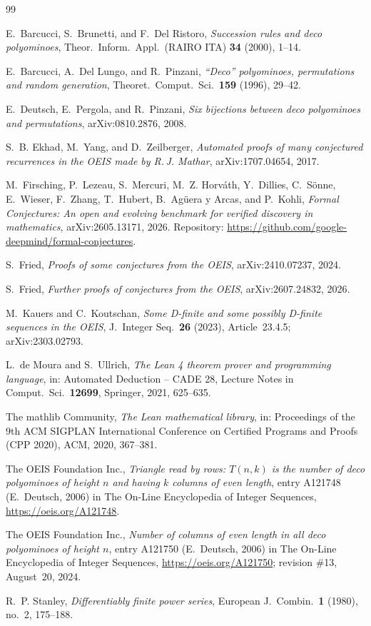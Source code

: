 \documentclass[11pt]{amsart}
\theoremstyle{plain}
\theoremstyle{definition}
\begin{document}
{\footnotesize
\begin{thebibliography}{99}

E.~Barcucci, S.~Brunetti, and F.~Del Ristoro, \emph{Succession rules and deco polyominoes}, Theor.\ Inform.\ Appl.\ (RAIRO ITA) \textbf{34} (2000), 1--14.

E.~Barcucci, A.~Del Lungo, and R.~Pinzani, \emph{``Deco'' polyominoes, permutations and random generation}, Theoret.\ Comput.\ Sci.\ \textbf{159} (1996), 29--42.

E.~Deutsch, E.~Pergola, and R.~Pinzani, \emph{Six bijections between deco polyominoes and permutations}, arXiv:0810.2876, 2008.

S.~B. Ekhad, M.~Yang, and D.~Zeilberger, \emph{Automated proofs of many conjectured recurrences in the OEIS made by R.\,J. Mathar}, arXiv:1707.04654, 2017.

M.~Firsching, P.~Lezeau, S.~Mercuri, M.~Z. Horv\'ath, Y.~Dillies, C.~S\"onne, E.~Wieser, F.~Zhang, T.~Hubert, B.~Ag\"uera y Arcas, and P.~Kohli, \emph{Formal Conjectures: An open and evolving benchmark for verified discovery in mathematics}, arXiv:2605.13171, 2026. Repository: \url{https://github.com/google-deepmind/formal-conjectures}.

S.~Fried, \emph{Proofs of some conjectures from the OEIS}, arXiv:2410.07237, 2024.

S.~Fried, \emph{Further proofs of conjectures from the OEIS}, arXiv:2607.24832, 2026.

M.~Kauers and C.~Koutschan, \emph{Some D-finite and some possibly D-finite sequences in the OEIS}, J.\ Integer Seq.\ \textbf{26} (2023), Article~23.4.5; arXiv:2303.02793.

L.~de Moura and S.~Ullrich, \emph{The Lean 4 theorem prover and programming language}, in: Automated Deduction -- CADE 28, Lecture Notes in Comput.\ Sci.\ \textbf{12699}, Springer, 2021, 625--635.

The mathlib Community, \emph{The Lean mathematical library}, in: Proceedings of the 9th ACM SIGPLAN International Conference on Certified Programs and Proofs (CPP 2020), ACM, 2020, 367--381.

The OEIS Foundation Inc., \emph{Triangle read by rows: $T(n,k)$ is the number of deco polyominoes of height $n$ and having $k$ columns of even length}, entry A121748 (E.~Deutsch, 2006) in The On-Line Encyclopedia of Integer Sequences, \url{https://oeis.org/A121748}.

The OEIS Foundation Inc., \emph{Number of columns of even length in all deco polyominoes of height $n$}, entry A121750 (E.~Deutsch, 2006) in The On-Line Encyclopedia of Integer Sequences, \url{https://oeis.org/A121750}; revision \#13, August~20, 2024.

R.~P. Stanley, \emph{Differentiably finite power series}, European J.\ Combin.\ \textbf{1} (1980), no.~2, 175--188.

\end{thebibliography}
}
\end{document}
